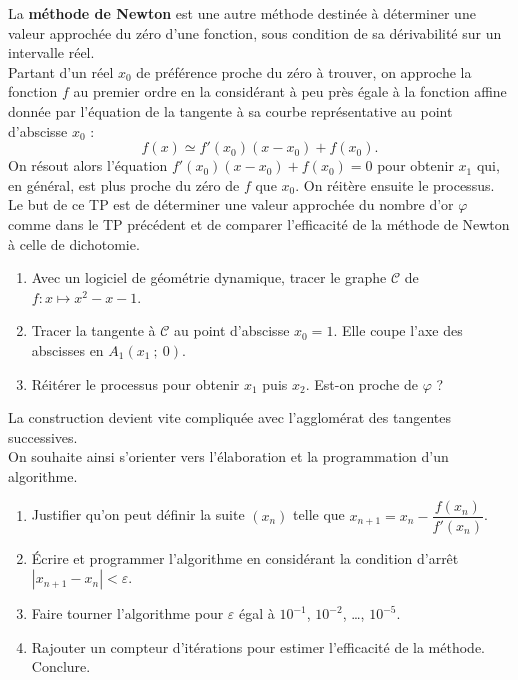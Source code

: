 \begin{TP}

La \textbf{méthode de Newton} est une autre méthode destinée à déterminer une valeur approchée du zéro d'une fonction, sous condition de sa dérivabilité sur un intervalle réel.\\
Partant d'un réel $x_0$ de préférence proche du zéro à trouver, on approche la fonction $f$ au premier ordre en la considérant à peu près égale à la fonction affine donnée par l'équation de la tangente à sa courbe représentative au point d'abscisse $x_0$ :
\[f(x)\simeq  f'(x_0)(x-x_0)+f(x_0).\]
On  résout alors l'équation $f'(x_0)(x-x_0)+f(x_0)=0$ pour obtenir $x_1$ qui, en général, est plus proche du zéro de $f$ que $x_0$. 
On réitère ensuite le processus.\\[2mm]
Le but de ce TP est de déterminer une valeur approchée du nombre d'or $\varphi$ comme dans le TP précédent et de comparer l'efficacité de la méthode de Newton à celle de dichotomie.
\vspace{-5mm}
\begin{enumerate}
\item Avec un logiciel de géométrie dynamique, tracer le graphe $\mathscr{C}$  de $f:x\mapsto x^2-x-1$.
\item Tracer la tangente à $\mathscr{C}$ au point d'abscisse $x_0=1$. Elle coupe l'axe des abscisses en $A_1(x_1~;~0)$.
\item Réitérer le processus pour obtenir $x_1$ puis $x_2$. Est-on proche de $\varphi$ ?
\end{enumerate}

La construction devient vite compliquée avec l'agglomérat des tangentes successives.\\
On souhaite ainsi s'orienter vers l'élaboration et la programmation d'un algorithme.
\begin{enumerate}
\item Justifier qu'on peut définir la suite $(x_n)$ telle que $x_{n+1}=x_n-\dfrac{f(x_n)}{f'(x_n)}$.
\item Écrire et programmer l'algorithme en considérant la condition d'arrêt $|x_{n+1}-x_n|<\varepsilon$. 
\item Faire tourner l'algorithme pour $\varepsilon$ égal à $10^{-1}$, $10^{-2}$, \ldots, $10^{-5}$.
\item Rajouter un compteur d'itérations pour estimer l'efficacité de la méthode. Conclure.
\end{enumerate}
\end{TP}
